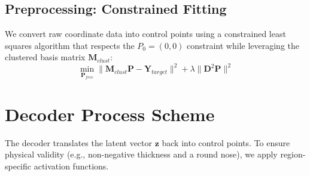 \documentclass[11pt, a4paper]{article}
\begin{document}
\subsection{Preprocessing: Constrained Fitting}
We convert raw coordinate data into control points using a constrained least squares algorithm that respects the $P_0=(0,0)$ constraint while leveraging the clustered basis matrix $\mathbf{M}_{clust}$:
\begin{equation}
    \min_{\mathbf{P}_{free}} \| \mathbf{M}_{clust} \mathbf{P} - \mathbf{Y}_{target} \|^2 + \lambda \| \mathbf{D}^2 \mathbf{P} \|^2
\end{equation}

\section{Decoder Process Scheme}

The decoder translates the latent vector $\mathbf{z}$ back into control points. To ensure physical validity (e.g., non-negative thickness and a round nose), we apply region-specific activation functions.
\end{document}

